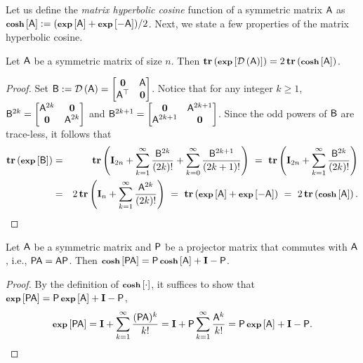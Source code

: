 %
%
Let us define the \emph{matrix hyperbolic cosine} function of a symmetric matrix $\matA$ as $ \coshm{\matA} := (\expm{\matA} + \expm{-\matA}) /2$. Next, we state a few properties of the matrix hyperbolic cosine.
\begin{lemma}\label{lem:dil_vs_expm}
Let $\matA$ be a symmetric matrix of size $n$. Then $\trace{\expm{\dil{\matA}}} = 2 \trace{ \coshm{\matA} }$.
\end{lemma}
\begin{proof}
Set $\matB :=\dil{\matA} = \left[ \begin{matrix} \zeromtx & \matA \\
 \matA^\top & \zeromtx
\end{matrix}\right]$. Notice that for any integer $k\geq 1$, $\matB^{2k} = \left[ \begin{matrix}
 \matA^{2k} & \zeromtx \\
 \zeromtx & \matA^{2k}
\end{matrix}\right]$ and $
\matB^{2k+1} = \left[ \begin{matrix}
 \zeromtx & \matA^{2k+1} \\
 \matA^{2k+1} & \zeromtx
\end{matrix}\right]$. Since the odd powers of $\matB$ are trace-less, it follows that
\begin{eqnarray*}
      \trace{ \expm{ \matB }} &  =  &  \trace{ \Id_{2n}  + \sum_{k=1}^{\infty}  \frac{\matB^{2k}}{(2k ) !}    + \sum_{k=0}^{\infty}  \frac{\matB^{2k+1}}{(2k + 1 ) !} }
			  \  =  \  \trace{ \Id_{2n}  + \sum_{k=1}^{\infty}  \frac{\matB^{2k}}{(2k ) !} } \\
			  &  =  &  2 \trace{ \Id_{n}  + \sum_{k=1}^{\infty}  \frac{\matA^{2k}}{(2k ) !} }
			  \  =  \  \trace{ \expm{\matA} + \expm{- \matA}  }
			  \  =  \  2\trace{ \coshm{\matA}}.
\end{eqnarray*}
\end{proof}
%
\begin{lemma}\label{lem:coshm_with_proj}
Let $\matA$ be a symmetric matrix and $\matP$ be a projector matrix that commutes with $\matA$, i.e., $\matP\matA=\matA\matP$. Then $\coshm{\matP\matA} = \matP\coshm{\matA} + \Id - \matP$.
\end{lemma}
\begin{proof}
By the definition of $\coshm{\cdot}$, it suffices to show that $\expm{\matP\matA}=\matP\expm{\matA}+ \Id - \matP$,
\begin{eqnarray*}
	\expm{\matP\matA}= \Id + \sum_{k=1}^{\infty} \frac{(\matP\matA)^k}{k!} = \Id + \matP\sum_{k=1}^{\infty} \frac{\matA^k}{k!} = \matP\expm{\matA}+ \Id - \matP.
\end{eqnarray*}
\end{proof}
